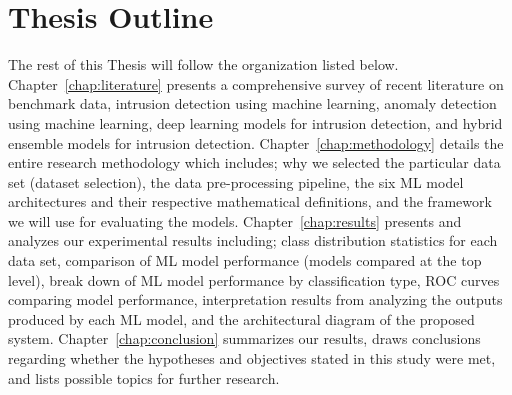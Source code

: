 \section{Thesis Outline}

The rest of this Thesis will follow the organization listed below. Chapter~\ref{chap:literature} presents a comprehensive survey of recent literature on benchmark data, intrusion detection using machine learning, anomaly detection using machine learning, deep learning models for intrusion detection, and hybrid ensemble models for intrusion detection. Chapter~\ref{chap:methodology} details the entire research methodology which includes; why we selected the particular data set (dataset selection), the data pre-processing pipeline, the six ML model architectures and their respective mathematical definitions, and the framework we will use for evaluating the models. Chapter~\ref{chap:results} presents and analyzes our experimental results including; class distribution statistics for each data set, comparison of ML model performance (models compared at the top level), break down of ML model performance by classification type, ROC curves comparing model performance, interpretation results from analyzing the outputs produced by each ML model, and the architectural diagram of the proposed system. Chapter~\ref{chap:conclusion} summarizes our results, draws conclusions regarding whether the hypotheses and objectives stated in this study were met, and lists possible topics for further research.